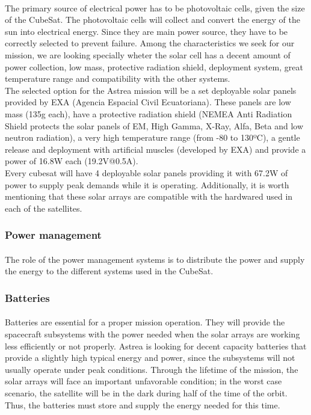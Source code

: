 \paragraph{}The primary source of electrical power has to be photovoltaic cells, given the size of the CubeSat. The photovoltaic cells will collect and convert the energy of the sun into electrical energy. Since they are main power source, they have to be correctly selected to prevent failure. Among the characteristics we seek for our mission, we are looking specially wheter the solar cell has a decent amount of power collection, low mass, protective radiation shield, deployment system, great temperature range and compatibility with the other systems.\\
The selected option for the Astrea mission will be a set deployable solar panels provided by EXA (Agencia Espacial Civil Ecuatoriana). These panels are low mass (135g each), have a protective radiation shield (NEMEA Anti Radiation Shield protects the solar panels of EM, High Gamma, X-Ray, Alfa, Beta and low neutron radiation), a very high temperature range (from -80 to 130ºC), a gentle release and deployment with artificial muscles (developed by EXA) and provide a power of 16.8W each (19.2V@0.5A). \\
Every cubesat will have 4 deployable solar panels providing it with 67.2W of power to supply peak demands while it is operating. Additionally, it is worth mentioning that these solar arrays are compatible with the hardwared used in each of the satellites.

\subsubsection{Power management}

\paragraph{}The role of the power management systems is to distribute the power and supply the energy to the different systems used in the CubeSat.

\subsubsection{Batteries}

\paragraph{}	Batteries are essential for a proper mission operation. They will provide the spacecraft subsystems with the power needed when the solar arrays are working less efficiently or not properly. Astrea is looking for decent capacity batteries that provide a slightly high typical energy and power, since the subsystems will not usually operate under peak conditions.
Through the lifetime of the mission, the solar arrays will face an important unfavorable condition; in the worst case scenario, the satellite will be in the dark during half of the time of the orbit. Thus, the batteries must store and supply the energy needed for this time.


